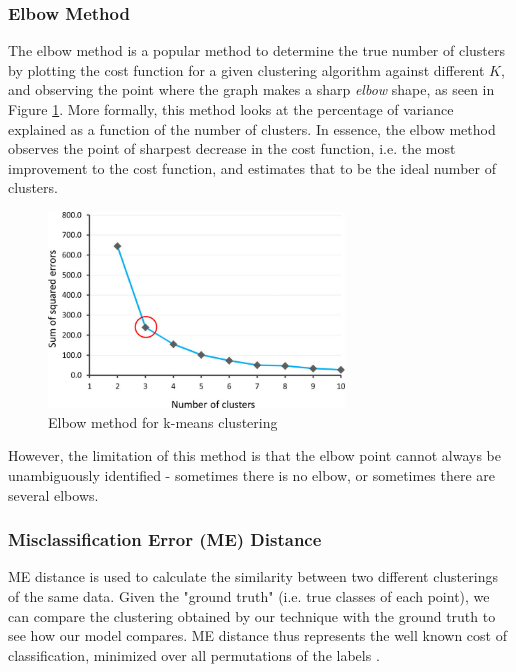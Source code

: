 \subsubsection{Elbow Method}\label{con1}
The elbow method \cite{kodinariya2013review} is a popular method to determine the true number of clusters by plotting the cost function for a given clustering algorithm against different $K$, and observing the point where the graph makes a sharp \textit{elbow} shape, as seen in Figure \ref{fig:elbow}. More formally, this method looks at the percentage of variance explained as a function of the number of clusters. In essence, the elbow method observes the point of sharpest decrease in the cost function, i.e. the most improvement to the cost function, and estimates that to be the ideal number of clusters.
\begin{figure}[h]
    \centering
    \includegraphics[width=0.7\textwidth]{Figures/elbow.png}
    \caption{Elbow method for k-means clustering}
    \label{fig:elbow}
\end{figure}
However, the limitation of this method is that the elbow point cannot always be unambiguously identified - sometimes there is no elbow, or sometimes there are several elbows.

\subsubsection{Misclassification Error (ME) Distance}\label{condundrum2}

ME distance is used to calculate the similarity between two different clusterings of the same data. Given the "ground truth" (i.e. true classes of each point), we can compare the clustering obtained by our technique with the ground truth to see how our model compares. ME distance thus represents the well known cost of classification, minimized over all permutations of the labels \cite{meila2005comparing}. 

